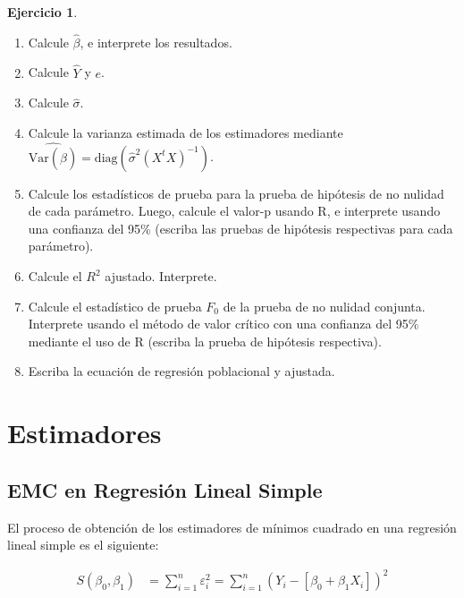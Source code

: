\documentclass[
  11pt,
]{book}
\providecommand{\tightlist}{%
  \setlength{\itemsep}{0pt}\setlength{\parskip}{0pt}}
\theoremstyle{definition}
\theoremstyle{definition}
\theoremstyle{definition}
\newtheorem{exercise}{Ejercicio}[chapter]
\theoremstyle{definition}
\theoremstyle{remark}
\begin{document}
\begin{exercise}
\begin{enumerate}
\def\labelenumi{\arabic{enumi}.}
\tightlist
\item
  Calcule \(\widehat\beta\), e interprete los resultados.
\item
  Calcule \(\widehat{Y}\) y \(e\).
\item
  Calcule \(\widehat\sigma\).
\item
  Calcule la varianza estimada de los estimadores mediante \(\widehat{\mathrm{Var}(\hat{\beta})} = \text{diag}(\widehat\sigma^2 (X^tX)^{-1})\).
\item
  Calcule los estadísticos de prueba para la prueba de hipótesis de no nulidad de cada parámetro. Luego, calcule el valor-p usando R, e interprete usando una confianza del 95\% (escriba las pruebas de hipótesis respectivas para cada parámetro).
\item
  Calcule el \(R^2\) ajustado. Interprete.
\item
  Calcule el estadístico de prueba \(F_0\) de la prueba de no nulidad conjunta. Interprete usando el método de valor crítico con una confianza del 95\% mediante el uso de R (escriba la prueba de hipótesis respectiva).
\item
  Escriba la ecuación de regresión poblacional y ajustada.
\end{enumerate}

\end{exercise}

\appendix {}


\chapter{Estimadores}\label{estimadores}

\section{EMC en Regresión Lineal Simple}\label{RLS-EMC}

El proceso de obtención de los estimadores de mínimos cuadrado en una regresión lineal simple es el siguiente:

\begin{equation}
\begin{split}
S(\beta_0,\beta_1) &= \sum_{i=1}^n\varepsilon_i^2 = \sum_{i=1}^n (Y_i - [\beta_0 + \beta_1X_i])^2
\end{split}
\label{eq:betasestimador-demostracion}
\end{equation}
\end{document}
